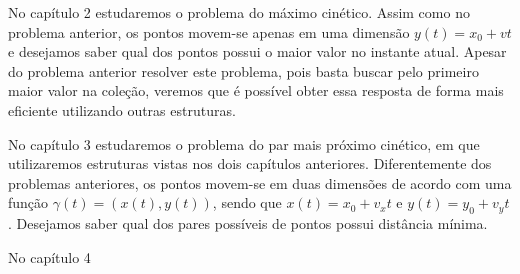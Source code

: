 No capítulo 2 estudaremos o problema do máximo cinético. Assim como no problema
anterior, os pontos movem-se apenas em uma dimensão $y(t) = x_0 + vt$ e
desejamos saber qual dos pontos possui o maior valor no instante atual. Apesar
do problema anterior resolver este problema, pois basta buscar pelo primeiro
maior valor na coleção, veremos que é possível obter essa resposta de forma mais
eficiente utilizando outras estruturas.

No capítulo 3 estudaremos o problema do par mais próximo cinético, em que
utilizaremos estruturas vistas nos dois capítulos anteriores. Diferentemente dos
problemas anteriores, os pontos movem-se em duas dimensões de acordo com uma
função $\gamma(t) = (x(t), y(t))$, sendo que $x(t) = x_0 + v_xt$ e $y(t) = y_0 +
v_yt$. Desejamos saber qual dos pares possíveis de pontos possui distância
mínima.

No capítulo 4 


